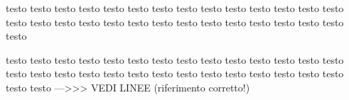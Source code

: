 \documentclass[10pt,a4paper,twoside]{memoir}
\newcounter{Atest}
\newcounter{Btest}
\newcounter{Ctest}
\begin{document}
\begin{pages}
\begin{Leftside}
\setcounter{Atest}{0}
\setcounter{Btest}{0}
\setcounter{Ctest}{0}
\beginnumbering
\setlength\parindent{0pt}%

    \pstart\relax
    testo testo testo testo testo testo testo testo testo testo testo testo testo testo testo testo testo testo testo testo testo testo testo testo testo testo testo testo testo 
    \pend
    \endnumbering
\end{Leftside}

\begin{Rightside}
    \setlength\parindent{0pt}
    \beginnumbering
    \pstart\relax 
    testo testo testo testo testo testo testo testo testo testo testo testo testo testo testo testo testo testo testo testo testo testo testo testo testo testo testo testo testo testo --->>> VEDI LINEE   (riferimento corretto!)
    \pend
    \endnumbering
\end{Rightside} 
\end{pages} 
\Pages
\end{document}

